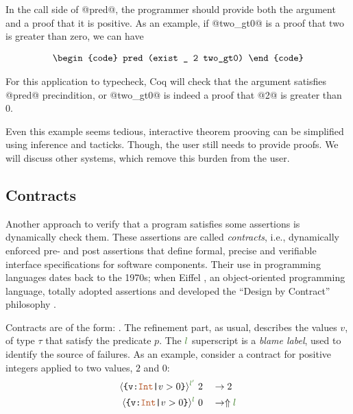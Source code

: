 \begin{comment}
where zgtz

\begin{verbatim}
Lemma zgtz : 0 > 0 -> False.
  crush.
Qed.

Inductive eq (A:Type) (x:A) : A -> Prop :=
    eq_refl : x = x :>A
\end{verbatim}
\end{comment}

In the call side of @pred@, the programmer should provide
both the argument and a proof that it is positive.
As an example,
if @two_gt0@ is a proof that two is greater than zero, we can have

$$\centering
\begin{tabular}{c}
\begin{code}
pred (exist _ 2 two_gt0)
\end{code}
\end{tabular}
$$
 
For this application to typecheck, Coq will check that
the argument satisfies @pred@ precindition, or 
@two_gt0@ is indeed a proof that @2@ is greater than 0. 

\begin{comment}
Theorem two_gt0 : 2 > 0.
  crush.
Qed.
\end{comment}

Even this example seems tedious, 
interactive theorem prooving can be simplified
using inference and tacticks. 
%
Though, the user still needs to provide proofs.
%
We will discuss other systems, which remove this burden from the user.

\subsection{Contracts}


Another approach to verify that a program satisfies some 
assertions is dynamically check them.
% 
These assertions are called \textit{contracts}, i.e., 
dynamically enforced pre- and post assertions that
define formal, precise and verifiable interface specifications 
for software components.
%	
Their use in programming languages dates back to the 1970s; 
when Eiffel \cite{Eiffel}, an object-oriented programming language,
totally adopted assertions and developed the 
``Design by Contract'' philosophy \cite{Meyer92}.

Contracts are of the form:
.
The refinement part, as usual,  describes the values $v$, of type $\tau$
that satisfy the predicate $p$. 
The $\mklabel{l}$ superscript is a \textit{blame label}, used to
identify the source of failures.
%
As an example, 
consider a contract for positive integers 
applied to two values, $2$ and $0$: 
\begin{align*}
\trefpos{l'}&\ 2 &&\rightarrow 2 \\
\trefpos{l}&\ 0  &&\rightarrow \elabel{l}
\end{align*}

